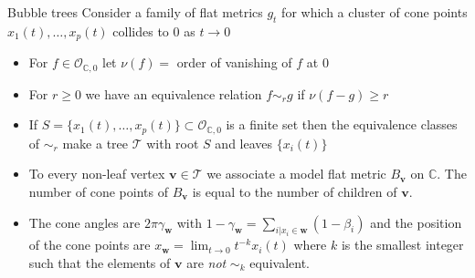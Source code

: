 \documentclass{beamer}
\newcommand{\C}{\mathbb{C}}
\begin{document}
\begin{frame}{Bubble trees}
	Consider a family of flat metrics \(g_t\) for which a cluster of cone points \(x_1(t), \ldots, x_p(t)\) collides to \(0\) as \(t \to 0\)
	\begin{itemize}
		\item For \(f \in \mathcal{O}_{\C, 0}\) let \(\nu(f) = \) order of vanishing of \(f\) at \(0\)
		\item For \(r \geq 0\) we have an equivalence relation \(f \sim_r g\) if \(\nu(f-g) \geq r\)
		\item If \(S = \{x_1(t), \ldots, x_p(t)\} \subset \mathcal{O}_{\C, 0}\) is a finite set then the equivalence classes of \(\sim_r\) make a tree \(\mathcal{T}\) with root \(S\) and leaves \(\{x_i(t)\}\)
		\item To every non-leaf vertex \(\mathbf{v} \in \mathcal{T}\) we associate a model flat metric \(B_{\mathbf{v}}\) on \(\C\). The number of cone points of \(B_{\mathbf{v}}\) is equal to the number of children of \(\mathbf{v}\). 
		\item  The cone angles are \(2\pi\gamma_{\mathbf{w}}\) with \(1-\gamma_{\mathbf{w}} = \sum_{i | x_i \in \mathbf{w}} (1-\beta_i)\) and the position of the cone points are \(x_{\mathbf{w}} = \lim_{t \to 0} t^{-k} x_i(t)\) where \(k\) is the smallest integer such that the elements of \(\mathbf{v}\) are \emph{not} \(\sim_k\) equivalent.  
	\end{itemize}
\end{frame}
\end{document}
